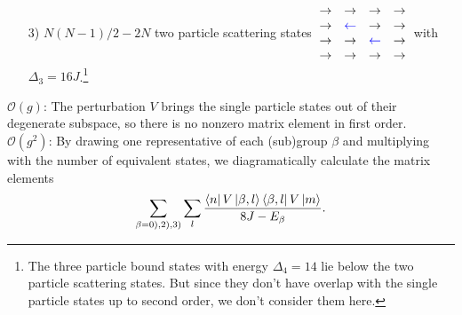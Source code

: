 \begin{enumerate}
	\item[3)] $N(N-1)/2 - 2N$ two particle scattering states $\: \begin{matrix} \rightarrow & \rightarrow & \rightarrow & \rightarrow \\ \rightarrow & \textcolor{blue}{\leftarrow} & \rightarrow & \rightarrow \\ \rightarrow & \rightarrow & \textcolor{blue}{\leftarrow} & \rightarrow \\ \rightarrow & \rightarrow & \rightarrow & \rightarrow \\ \end{matrix} \:$ with $\Delta_3 = 16J$.\footnote{The three particle bound states with energy $\Delta_4 = 14$ lie below the two particle scattering states. But since they don't have overlap with the single particle states up to second order, we don't consider them here.}
\end{enumerate}
\noindent $\mathcal{O}(g)$: The perturbation $V$ brings the single particle states out of their degenerate subspace, so there is no nonzero matrix element in first order. \\

\noindent $\mathcal{O}(g^2)$: By drawing one representative of each (sub)group $\beta$ and multiplying with the number of equivalent states, we diagramatically calculate the matrix elements 
\begin{equation}
\sum\limits_{\beta=0),2),3)} \sum\limits_{l} \frac{\bra{n} V \ket{\beta, l} \bra{\beta, l} V \ket{m}}{8J - E_{\beta}}.
\end{equation}

